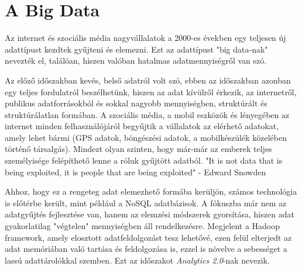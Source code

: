 \section{A Big Data}

Az internet és szociális média nagyvállalatok a 2000-es években egy teljesen új adattípust kezdtek gyűjteni és elemezni. Ezt az adattípust "big data-nak" nevezték el, találóan, hiszen valóban hatalmas adatmennyiségről van szó.

Az előző időszakban kevés, belső adatról volt szó, ebben az időszakban azonban egy teljes fordulatról beszélhetünk, hiszen az adat kívülről érkezik, az internetről, publikus adatforrásokból és sokkal nagyobb mennyiségben, struktúrált és struktúrálatlan formában. A szociális média, a mobil eszközök és lényegében az internet minden felhasználójáról begyűjtik a vállalatok az elérhető adatokat, amely lehet bármi (GPS adatok, böngészési adatok, a mobilkészülék közelében történő társalgás). Mindezt olyan szinten, hogy már-már az emberek teljes személyisége felépíthető lenne a róluk gyűjtött adatból. "It is not data that is being exploited, it is people that are being exploited" - Edward Snowden

Ahhoz, hogy ez a rengeteg adat elemezhető formába kerüljön, számos technológia is előtérbe került, mint például a NoSQL adatbázisok. A fókuszba már nem az adatgyűjtés fejlesztése van, hanem az elemzési módszerek gyorsítása, hiszen adat gyakorlatilag "végtelen" mennyiségben áll rendelkezésre. Megjelent a Hadoop framework, amely elosztott adatfeldolgozást tesz lehetővé, ezen felül elterjedt az adat memóriában való tartása és feldolgozása is, ezzel is növelve a sebességet a lassú adattárolókkal szemben. Ezt az időszakot \textit{Analytics 2.0}-nak nevezik.
